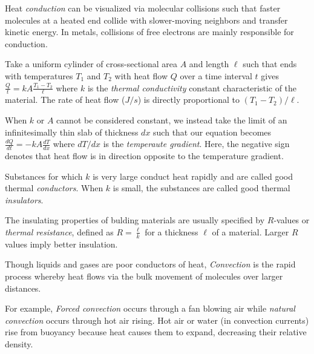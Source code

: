 \begin{definition}[Conduction]
    Heat \emph{conduction} can be visualized via molecular collisions such that faster molecules at a heated end collide with slower-moving neighbors and transfer kinetic energy. In metals, collisions of free electrons are mainly responsible for conduction.
\end{definition}
\begin{remark}
    Take a uniform cylinder of cross-sectional area $A$ and length $\ell$ such that ends with temperatures $T_1$ and $T_2$ with heat flow $Q$ over a time interval $t$ gives $\frac{Q}{t} = kA\frac{T_1-T_2}{\ell}$ where $k$ is the \emph{thermal conductivity} constant characteristic of the material. The rate of heat flow ($J/s$) is directly proportional to $(T_1-T_2)/\ell$.
\end{remark}
\begin{definition}
    When $k$ or $A$ cannot be considered constant, we instead take the limit of an infinitesimally thin slab of thickness $dx$ such that our equation becomes $\frac{dQ}{dt} = -kA\frac{dT}{dx}$ where $dT/dx$ is the \emph{temperaute gradient}. Here, the negative sign denotes that heat flow is in direction opposite to the temperature gradient.
\end{definition}
\begin{definition}
    Substances for which $k$ is very large conduct heat rapidly and are called good thermal \emph{conductors}. When $k$ is small, the substances are called good thermal \emph{insulators}.
\end{definition}
\begin{definition}
    The insulating properties of bulding materials are usually specified by $R$-values or \emph{thermal resistance}, defined as $R = \frac{\ell}{k}$ for a thickness $\ell$ of a material. Larger $R$ values imply better insulation.
\end{definition}
\begin{definition}[Convection]
    Though liquids and gases are poor conductors of heat, \emph{Convection} is the rapid process whereby heat flows via the bulk movement of molecules over larger distances.
\end{definition}
\begin{definition}
    For example, \emph{Forced convection} occurs through a fan blowing air while \emph{natural convection} occurs through hot air rising. Hot air or water (in convection currents) rise from buoyancy because heat causes them to expand, decreasing their relative density. 
\end{definition}
